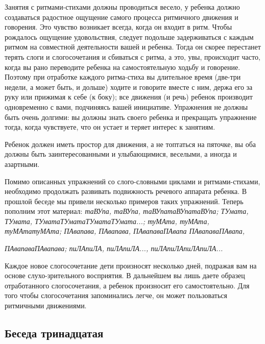 \documentclass{book}
\renewcommand{\emph}[1]{\textit{#1}}
\begin{document}
Занятия с ритмами-стихами должны проводиться весело, у ребенка должно
создаваться радостное ощущение самого процесса ритмичного движения и
говорения. Это чувство возникает всегда, когда он входит в ритм. Чтобы
рождалось ощущение удовольствия, следует подольше задерживаться с каждым
ритмом на совместной деятельности вашей и ребенка. Тогда он скорее
перестанет терять слоги и слогосочетания и сбиваться с ритма, а это,
увы, происходит часто, когда вы рано переводите ребенка на
самостоятельную ходьбу и говорение. Поэтому при отработке каждого
ритма-стиха вы длительное время (две-три недели, а может быть, и дольше)
ходите и говорите вместе с ним, держа его за руку или прижимая к себе (к
боку); все движения (и речь) ребенок производит одновременно с вами,
подчиняясь вашей инициативе. Упражнения не должны быть очень долгими: вы
должны знать своего ребенка и прекращать упражнение тогда, когда
чувствуете, что он устает и теряет интерес к занятиям.

Ребенок должен иметь простор для движения, а не топтаться на пяточке, вы
оба должны быть заинтересованными и улыбающимися, веселыми, а иногда и
азартными.

Помимо описанных упражнений со слого-словными циклами и ритмами-стихами,
необходимо продолжать развивать подвижность речевого аппарата ребенка. В
прошлой беседе мы привели несколько примеров таких упражнений. Теперь
пополним этот материал: \emph{таВУпа, таВУпа, таВУпатаВУпатаВУпа;
ТУмата, ТУмата, ТУматаТУматаТУматаТУмата...; туМАта, туМАта,
туМАтатуМАта; ПАвапава, ПАвапава, ПАвапаваПАвапа ПАвапаваПАвапа,}

\emph{ПАвапаваПАвапава; пиЛАпиЛА, пиЛАпиЛА..., пиЛАпиЛАпиЛАпиЛА...}

Каждое новое слогосочетание дети произносят несколько дней, подражая вам
на основе слухо-зрительного восприятия. В дальнейшем вы лишь даете
образец отработанного слогосочетания, а ребенок произносит его
самостоятельно. Для того чтобы слогосочетания запоминались легче, он
может пользоваться ритмичными движениями.

\subsection*{Беседа тринадцатая}
\end{document}
